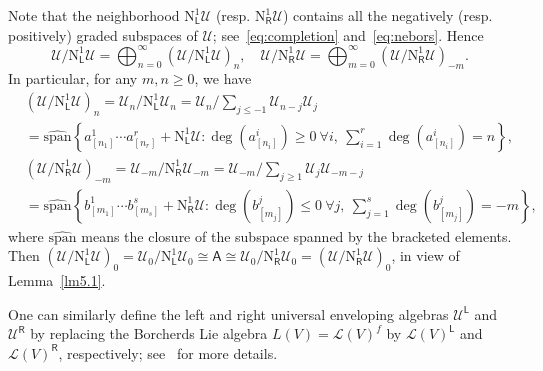 \documentclass[12pt,a4paper,reqno]{amsart}
\numberwithin{equation}{section}
\theoremstyle{definition}
\def\L{\mathsf{L}}
\def\R{\mathsf{R}}
\def\spn{\mathrm{span}}
\def\o{\otimes}
\def\scrU{\mathscr{U}}
\def\rN{\mathrm{N}}
\def\A{\mathsf{A}}
\begin{document}
	Note that the neighborhood $\rN^1_\L \scrU$ (resp. $\rN^1_\R \scrU$) contains all the negatively (resp. positively) graded subspaces of $\scrU$; see~\eqref{eq:completion} and~\eqref{eq:nebors}. Hence
	\begin{equation}\label{eq:gradationleftright}
		\scrU/	\rN^1_\L \scrU=\bigoplus_{n=0}^\infty(\scrU/	\rN^1_\L \scrU)_n,\quad \scrU/\rN^1_\R \scrU=\bigoplus_{m=0}^\infty (\scrU/\rN^1_\R \scrU)_{-m}.
	\end{equation}
	In particular, for any $m,n\geq 0$, we have
	\begin{align*}
		&(\scrU/	\rN^1_\L \scrU)_n=\scrU_n/	\rN^1_\L \scrU_n=\scrU_n \big/\sum_{j\leq -1} \scrU_{n-j}\scrU_j\\
		&=\widehat{\spn}\left\{a^1_{[n_1]}\cdots a^r_{[n_r]}+\rN^1_\L \scrU: \deg(a^i_{[n_i]})\geq 0\ \forall i,\ \sum_{i=1}^r \deg(a^i_{[n_i]})=n \right\},\\
		&(\scrU/	\rN^1_\R \scrU)_{-m}=\scrU_{-m}/	\rN^1_\R \scrU_{-m}=\scrU_{-m}\big/\sum_{j\geq 1} \scrU_{j}\scrU_{-m-j}\\
		&=\widehat{\spn}\left\{b^1_{[m_1]}\cdots b^s_{[m_s]}+\rN^1_\R \scrU: \deg(b^j_{[m_j]})\leq 0\ \forall j,\ \sum_{j=1}^s \deg(b^j_{[m_j]})=-m \right\},
	\end{align*}
    where $\widehat{\spn}$ means the closure of the subspace spanned by the bracketed elements.
	Then $(\scrU/	\rN^1_\L \scrU)_0=\scrU_0/\rN^1_\L \scrU_0\cong \A\cong \scrU_0/\rN^1_\R \scrU_0=(\scrU/	\rN^1_\R \scrU)_{0}$, in view of Lemma~\ref{lm5.1}.

One can similarly define the left and right universal enveloping algebras $\scrU^\L$ and $\scrU^\R$ by replacing the Borcherds Lie algebra $L(V)=\mathcal{L}(V)^f$ by $\mathcal{L}(V)^\L$ and $\mathcal{L}(V)^\R$, respectively; see~\cite[Section 2]{DGK2} for more details.
	
	
\end{document}
